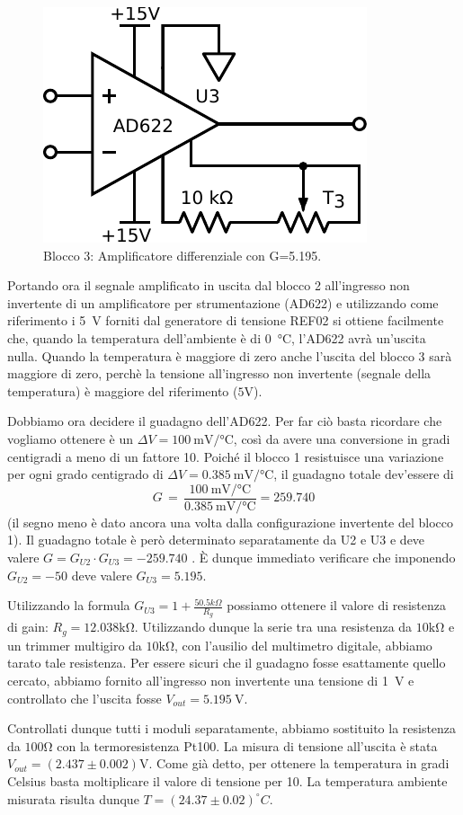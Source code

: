 \begin{figure}
\centering
\includegraphics[width=.25\textwidth]{../E06/latex/P3.pdf}
\caption{Blocco 3: Amplificatore differenziale con G=5.195.}
\label{cir6:2wire}
\end{figure}

Portando ora il segnale amplificato in uscita dal blocco 2 all'ingresso non invertente di un amplificatore per strumentazione (AD622) e utilizzando come riferimento i \SI{5}{\volt} forniti dal generatore di tensione REF02 si ottiene facilmente che, quando la temperatura dell'ambiente è di \SI{0}{\celsius}, l'AD622 avrà un'uscita nulla.
Quando la temperatura è maggiore di zero anche l'uscita del blocco 3 sarà maggiore di zero, perchè la tensione all'ingresso non invertente (segnale della temperatura) è maggiore del riferimento ($5\si{\volt}$).

Dobbiamo ora decidere il guadagno dell'AD622.
Per far ciò basta ricordare che vogliamo ottenere è un $\Delta V=\SI{100}{\milli\volt}/\si{\celsius}$, così da avere una conversione in gradi centigradi a meno di un fattore 10.
Poiché il blocco 1 resistuisce una variazione per ogni grado centigrado di $\Delta V=\SI{0.385}{\milli\volt}/\si{\celsius}$, il guadagno totale dev'essere di
$$G\,=\,\frac{\SI{100}{\milli\volt}/\si{\celsius}}{\SI{0.385}{\milli\volt}/\si{\celsius}}=\num{259.740}$$
(il segno meno è dato ancora una volta dalla configurazione invertente del blocco 1).
Il guadagno totale è però determinato separatamente da U2 e U3 e deve valere $G= G_{U2}\cdot G_{U3}=-259.740$ .
È dunque immediato verificare che imponendo $G_{U2}=-50$ deve valere $G_{U3}=5.195$.

Utilizzando la formula $G_{U3}=1+\frac{50.5k\Omega}{R_g}$ possiamo ottenere il valore di resistenza di gain: $R_g=12.038\si{\kilo\ohm}$.
Utilizzando dunque la serie tra una resistenza da $10\si{\kilo\ohm}$ e un trimmer multigiro da $10\si{\kilo\ohm}$, con l'ausilio del multimetro digitale, abbiamo tarato tale resistenza. 
Per essere sicuri che il guadagno fosse esattamente quello cercato, abbiamo fornito all'ingresso non invertente una tensione di \SI{1}{\volt} e controllato che l'uscita fosse $V_{out}=\SI{5.195}{\V}$. 

Controllati dunque tutti i moduli separatamente, abbiamo sostituito la resistenza da $100\si{\ohm}$ con la termoresistenza Pt100.
La misura di tensione all'uscita è stata $V_{out}=(2.437\pm 0.002)\si{\volt}$.
Come già detto, per ottenere la temperatura in gradi Celsius basta moltiplicare il valore di tensione per 10.
La temperatura ambiente misurata risulta dunque $T=(24.37\pm0.02)^{\circ}C$.

